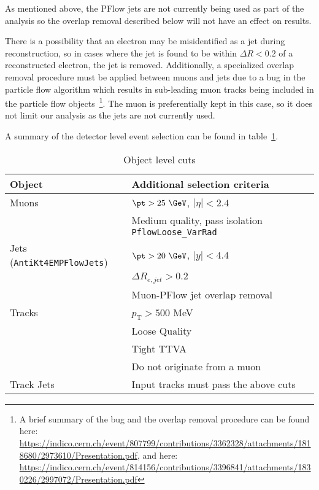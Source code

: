 As mentioned above, the PFlow jets are not currently being used as part of the analysis so the overlap removal described below will not have an effect on results.

There is a possibility that an electron may be misidentified as a jet during reconstruction, so in cases where the jet is found to be within $\Delta R < 0.2$ of a reconstructed electron, the jet is removed.
Additionally, a specialized overlap removal procedure must be applied between muons and jets due to a bug in the particle flow algorithm which results in sub-leading muon tracks being included in the particle flow objects~\footnote{A brief summary of the bug and the overlap removal procedure can be found here: \url{https://indico.cern.ch/event/807799/contributions/3362328/attachments/1818680/2973610/Presentation.pdf},
and here: \url{https://indico.cern.ch/event/814156/contributions/3396841/attachments/1830226/2997072/Presentation.pdf}}.
The muon is preferentially kept in this case, so it does not limit our analysis as the jets are not currently used.

A summary of the detector level event selection can be found in table~\ref{tab:ObjCuts}.


\begin{table}[h!]
    \centering
    \begin{tabular}{l|l}
    \hline
     \textbf{Object} & \textbf{Additional selection criteria} \\ \hline
     Muons & $\pt>25~\GeV$, $|\eta|<2.4$ \\
           & Medium quality, pass isolation \texttt{PflowLoose\_VarRad} \\ \hline
     Jets (\texttt{AntiKt4EMPFlowJets}) & $\pt>20~\GeV$, $|y|<4.4$ \\
                                        & $\Delta R_{e,jet} > 0.2$ \\
                                        & Muon-PFlow jet overlap removal \\ \hline
     Tracks & $p_{\text{T}} > 500$ MeV \\
            & Loose Quality \\
            & Tight TTVA \\
            & Do not originate from a muon \\ \hline
     Track Jets & Input tracks must pass the above cuts \\ \hline
    \end{tabular}
    \caption{Object level cuts}
    \label{tab:ObjCuts}
\end{table}

